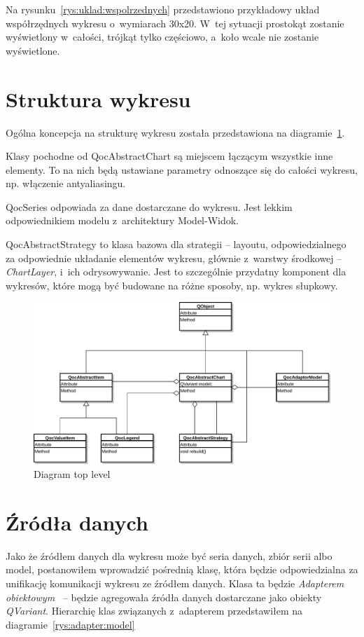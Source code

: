 Na rysunku~\ref{rys:uklad:wspolrzednych} przedstawiono przykładowy układ współrzędnych wykresu o~wymiarach 30x20. W~tej sytuacji prostokąt zostanie wyświetlony w~całości, trójkąt tylko częściowo, a~koło wcale nie zostanie wyświetlone.


\section{Struktura wykresu}
Ogólna koncepcja na strukturę wykresu została przedstawiona na diagramie~\ref{rys:klasy:top_level}.

Klasy pochodne od QocAbstractChart są miejscem łączącym wszystkie inne elementy. To na nich będą ustawiane parametry odnoszące się do całości wykresu, np. włączenie antyaliasingu.

QocSeries odpowiada za dane dostarczane do wykresu. Jest lekkim odpowiednikiem modelu z~architektury Model-Widok.

QocAbstractStrategy to klasa bazowa dla strategii -- layoutu, odpowiedzialnego za odpowiednie układanie elementów wykresu, głównie z~warstwy środkowej -- \textit{ChartLayer}, i~ich odrysowywanie. Jest to szczególnie przydatny komponent dla wykresów, które mogą być budowane na różne sposoby, np. wykres słupkowy.


\begin{figure}[H]
\centering
\includegraphics[scale=0.7]{img/klasy-top_level.pdf}
\caption{Diagram top level}\label{rys:klasy:top_level}
\end{figure}

\section{Źródła danych}

Jako że źródłem danych dla wykresu może być seria danych, zbiór serii albo model, postanowiłem wprowadzić pośrednią klasę, która będzie odpowiedzialna za unifikację komunikacji wykresu ze źródłem danych. Klasa ta będzie \textit{Adapterem obiektowym}~\cite{Patterns} -- będzie agregowała źródła danych dostarczane jako obiekty \textit{QVariant}. Hierarchię klas związanych z~adapterem przedstawiłem na diagramie~\ref{rys:adapter:model}

